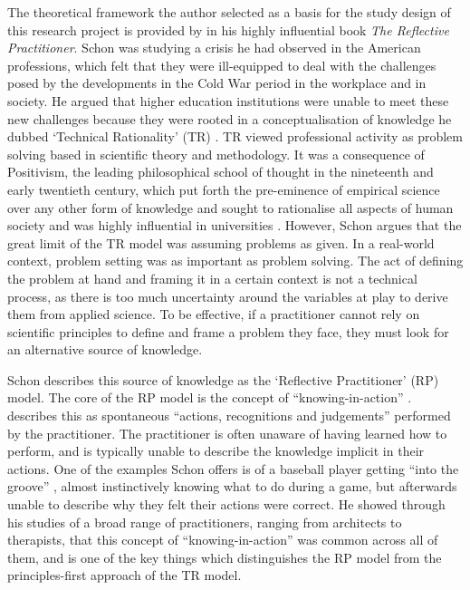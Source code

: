 \documentclass{l4proj}
\begin{document}
The theoretical framework the author selected as a basis for the study design of this research project is provided by \citet{schon1984reflective} in his highly influential book \emph{The Reflective Practitioner}. Schon was studying a crisis he had observed in the American professions, which felt that they were ill-equipped to deal with the challenges posed by the developments in the Cold War period in the workplace and in society. He argued that higher education institutions were unable to meet these new challenges because they were rooted in a conceptualisation of knowledge he dubbed ‘Technical Rationality’ (TR) \citep{schon1984reflective}. TR viewed professional activity as problem solving based in scientific theory and methodology. It was a consequence of Positivism, the leading philosophical school of thought in the nineteenth and early twentieth century, which put forth the pre-eminence of empirical science over any other form of knowledge and sought to rationalise all aspects of human society and was highly influential in universities \citep{schon1984reflective}. However, Schon argues that the great limit of the TR model was assuming problems as given. In a real-world context, problem setting was as important as problem solving. The act of defining the problem at hand and framing it in a certain context is not a technical process, as there is too much uncertainty around the variables at play to derive them from applied science. To be effective, if a practitioner cannot rely on scientific principles to define and frame a problem they face, they must look for an alternative source of knowledge. 

Schon describes this source of knowledge as the ‘Reflective Practitioner’ (RP) model. The core of the RP model is the concept of “knowing-in-action” \citep{schon1984reflective}. \citet{schon1984reflective} describes this as spontaneous “actions, recognitions and judgements” performed by the practitioner. The practitioner is often unaware of having learned how to perform, and is typically unable to describe the knowledge implicit in their actions. One of the examples Schon offers is of a baseball player getting “into the groove” \citep{schon1984reflective}, almost instinctively knowing what to do during a game, but afterwards unable to describe why they felt their actions were correct. He showed through his studies of a broad range of practitioners, ranging from architects to therapists, that this concept of “knowing-in-action” was common across all of them, and is one of the key things which distinguishes the RP model from the principles-first approach of the TR model. 
\end{document}
